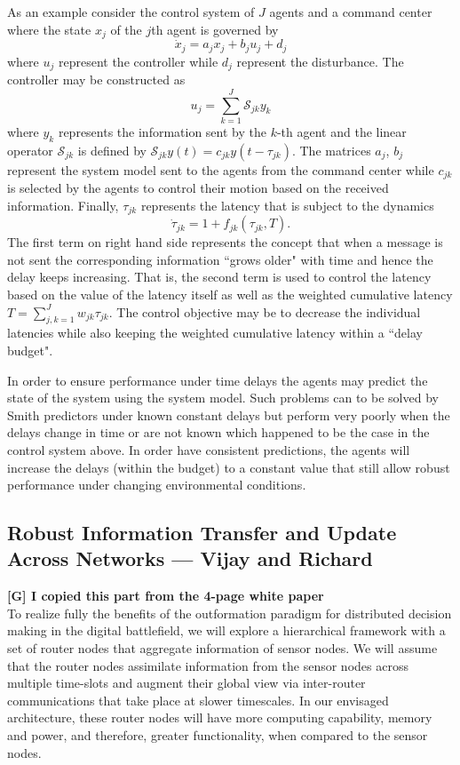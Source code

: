 \documentclass[12pt,letterpaper]{article}
\begin{document}
As an example consider the control system of $J$ agents and a command center where the state $x_j$ of the $j$th agent is governed by
\begin{equation}
\dot{x}_j = a_j x_j + b_j u_j + d_j
\end{equation}
where $u_j$ represent the controller while $d_j$ represent the disturbance. The controller may be constructed as
\begin{equation}
u_j = \sum_{k=1}^J \mathcal{S}_{jk} y_k
\end{equation}
where $y_k$ represents the information sent by the $k$-th agent and the linear operator $\mathcal{S}_{jk}$ is defined by $\mathcal{S}_{jk} y(t) = c_{jk} y(t-\tau_{jk})$. The matrices $a_j$, $b_j$ represent the system model sent to the agents from the command center while $c_{jk}$ is selected by the agents to control their motion based on the received information.
Finally, $\tau_{jk}$ represents the latency that is subject to the dynamics
\begin{equation}
\dot{\tau}_{jk} = 1 + f_{jk}(\tau_{jk},T).
\end{equation}
The first term on right hand side represents the concept that when a message is not sent the corresponding information ``grows older" with time and hence the delay keeps increasing. That is, the second term is used to control the latency based on the value of the latency itself as well as the weighted cumulative latency $T = \sum_{j,k=1}^{J} w_{jk} \tau_{jk}$. The control objective may be to decrease the individual latencies while also keeping the weighted cumulative latency within a ``delay budget".

In order to ensure performance under time delays the agents may predict the state of the system using the system model. Such problems can to be solved by Smith predictors under known constant delays but perform very poorly when the delays change in time or are not known which happened to be the case in the control system above. In order have consistent predictions, the agents will increase the delays (within the budget) to a constant value that still allow robust performance under changing environmental conditions.


\subsection{Robust Information Transfer and Update Across Networks --- Vijay and Richard}

\textbf{[G] I copied this part from the 4-page white paper}\\ 
To realize fully the benefits of the outformation paradigm for distributed decision making in the digital battlefield, we will explore a hierarchical framework with a set of router nodes that aggregate information of sensor nodes. We will assume that the router nodes assimilate information from the sensor nodes across multiple time-slots and augment their global view via inter-router communications that take place at slower timescales. In our envisaged architecture, these router nodes will have more computing capability, memory and power, and therefore, greater functionality, when compared to the sensor nodes. 
\end{document}
